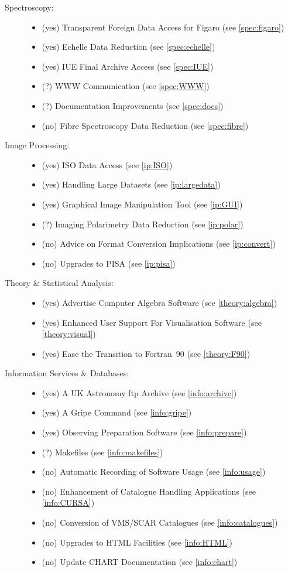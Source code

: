 \begin{htmlonly}
\renewcommand{\pry}[3]{\item (yes) #1 (see \ref{#2:#3})}
\renewcommand{\prq}[3]{\item (?) #1 (see \ref{#2:#3}) \\}
\renewcommand{\prn}[3]{\item (no) #1 (see \ref{#2:#3}) \\}
\begin{center}
\begin{description}
\item[Spectroscopy:]
\begin{itemize}
\pry{Transparent Foreign Data Access for Figaro}{spec}{figaro}
\pry{Echelle Data Reduction}{spec}{echelle}
\pry{IUE Final Archive Access}{spec}{IUE}
\prq{WWW Communication}{spec}{WWW}
\prq{Documentation Improvements}{spec}{docs}
\prn{Fibre Spectroscopy Data Reduction}{spec}{fibre}
\end{itemize}

\item[Image Processing:]
\begin{itemize}
\pry{ISO Data Access}{ip}{ISO}
\pry{Handling Large Datasets}{ip}{largedata}
\pry{Graphical Image Manipulation Tool}{ip}{GUI}
\prq{Imaging Polarimetry Data Reduction}{ip}{polar}
\prn{Advice on Format Conversion Implications}{ip}{convert}
\prn{Upgrades to PISA}{ip}{pisa}
\end{itemize}

\item[Theory \& Statistical Analysis:]
\begin{itemize}
\pry{Advertise Computer Algebra Software}{theory}{algebra}
\pry{Enhanced User Support For Visualisation Software}{theory}{visual}
\pry{Ease the Transition to Fortran~90}{theory}{F90}
\end{itemize}

\item[Information Services \& Databases:]
\begin{itemize}
\pry{A UK Astronomy ftp Archive}{info}{archive}
\pry{A Gripe Command}{info}{gripe}
\pry{Observing Preparation Software}{info}{prepare}
\prq{Makefiles}{info}{makefiles}
\prn{Automatic Recording of Software Usage}{info}{usage}
\prn{Enhancement of Catalogue Handling Applications}{info}{CURSA}
\prn{Conversion of VMS/SCAR Catalogues}{info}{catalogues}
\prn{Upgrades to HTML Facilities}{info}{HTML}
\prn{Update CHART Documentation}{info}{chart}
\end{itemize}


\end{description}
\end{center}
\end{htmlonly}
